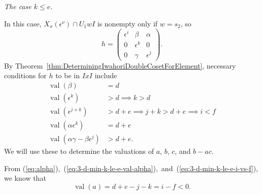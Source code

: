 \documentclass{amsart}
\theoremstyle{definition}
\def\e{\epsilon}
\def\val{\mathop{\mathrm{val}}}
\def\en{\e^{\nu}}
\def\X{X_x(\en)}
\newcommand\subsubsubsection[1]{\vspace{0.5em}\begin{paragraph}{}\noindent \normalfont\large\itshape #1. \end{paragraph}\vspace{0.5em}}
\begin{document}
  \subsubsubsection{The case $k \le e$}
  In this case, $\X \cap U_1wI$ is nonempty only if $w = s_2$, so
  \begin{equation*}
    h = \begin{pmatrix}
      \e^i & \beta & \alpha \\
      0 & \e^k & 0 \\
      0 & \gamma & \e^j
    \end{pmatrix}.
  \end{equation*}
  By Theorem~\ref{thm:DeterminingIwahoriDoubleCosetForElement}, necessary
  conditions for $h$ to be in $IxI$ include
  \begin{align}
    \label{eq:3-d-min-k-le-e-val-beta}
    \val(\beta) &= d \\
    \label{eq:3-d-min-k-le-e-k-vs-d}
    \val(\e^k) &> d \implies k > d \\
    \label{eq:3-d-min-k-le-e-i-vs-f}
    \val(\e^{j+k}) &> d + e \implies j + k > d + e \implies i < f \\
    \label{eq:3-d-min-k-le-e-val-alpha}
    \val(\alpha\e^k) &= d + e \\
    \label{eq:3-d-min-k-le-e-val-minor}
    \val(\alpha\gamma - \beta\e^j) &> d + e.
  \end{align}
  We will use these to determine the valuations of $a$, $b$, $c$, and $b -
  ac$.

  From
  (\ref{eq:alpha}),~(\ref{eq:3-d-min-k-le-e-val-alpha}),~and~(\ref{eq:3-d-min-k-le-e-i-vs-f}),
  we know that
  \begin{equation}
    \label{eq:3-d-min-k-le-e-val-a}
    \val(a) = d + e - j - k = i - f < 0.
  \end{equation}
\end{document}
